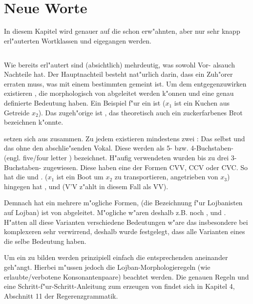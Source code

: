 \chapter{Neue Worte}
In diesem Kapitel wird genauer auf die schon erw"ahnten, aber nur sehr knapp erl"auterten Wortklassen  und  eigegangen
werden.

\section{}
Wie bereits erl"autert sind  (absichtlich) mehrdeutig, was sowohl Vor- alsauch Nachteile hat. Der Hauptnachteil besteht nat"urlich
darin, dass ein Zuh"orer erraten muss, was mit einem bestimmten  gemeint ist. Um dem entgegenzuwirken existieren , die
morphologisch von  abgeleitet werden k"onnen und eine genau definierte Bedeutung haben. Ein Beispiel f"ur ein  ist
 ($x_1$ ist ein Kuchen aus Getreide $x_2$). Das zugeh"orige  ist , das theoretisch
auch ein zuckerfarbenes Brot bezeichnen k"onnte.

 setzen sich aus  zusammen. Zu jedem  existieren mindestens zwei : Das  selbst und das  ohne
den abschlie"senden Vokal. Diese  werden als 5- bzw. 4-Buchstaben- (engl. five/four letter ) bezeichnet. 
H"aufig verwendeten  wurden bis zu drei 3-Buchstaben- zugewiesen. Diese  haben eine der Formen CVV, CCV oder
CVC.
So hat  die   und .  ($x_1$ ist ein Boot um $x_2$ zu transportieren, angetrieben von $x_3$) hingegen hat ,  und  (V'V z"ahlt in diesem Fall als VV).

Demnach hat ein  mehrere m"ogliche Formen,  (die Bezeichnung f"ur Lojbanisten auf Lojban) ist von
 abgeleitet. M"ogliche  w"aren deshalb z.B. noch ,  und . H"atten all diese Varianten verschiedene Bedeutungen w"are das insbesondere bei komplexeren  sehr verwirrend, deshalb wurde festgelegt, dass alle Varianten eines  die selbe Bedeutung haben.

Um ein  zu bilden werden prinzipiell einfach die entsprechenden  aneinander geh"angt. Hierbei m"ussen
jedoch die Lojban-Morphologieregeln (wie erlaubte/verbotene Konsonantenpaare) beachtet werden. Die genauen Regeln und eine
Schritt-f"ur-Schritt-Anleitung zum erzeugen von  findet sich in Kapitel 4, Abschnitt 11 der Regerenzgrammatik.

